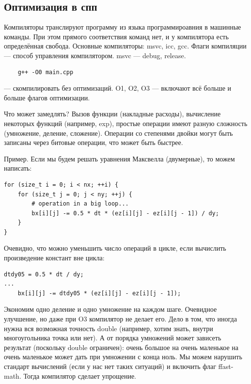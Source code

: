 \documentclass{book}
\begin{document}
\subsection{Оптимизация в спп}

Компиляторы транслируют программу из языка программироавния в машинные команды. При этом прямого
соответствия команд нет, и у компилятора есть определённая свобода. Основные компиляторы: msvc,
icc, gcc. Флаги компиляции --- способ управления компилятором. msvc --- debug, release.
\begin{verbatim}
    g++ -O0 main.cpp
\end{verbatim}
--- скомпилировать без оптимизаций. O1, O2, O3 --- включают всё больше и больше флагов оптимизации.

Что может замедлять? Вызов функции (накладные расходы), вычисление некоторых функций (например,
exp), простые операции имеют разную сложность (умножение, деление, сложение). Операции со степенями
двойки могут быть записаны через битовые операции, что может быть быстрее.

Пример. Если мы будем решать уравнения Максвелла (двумерные), то можем написать:
\begin{verbatim}
for (size_t i = 0; i < nx; ++i) {
    for (size_t j = 0; j < ny; ++j) {
        # operation in a big loop...
        bx[i][j] -= 0.5 * dt * (ez[i][j] - ez[i][j - 1]) / dy;
    }
}
\end{verbatim}
Очевидно, что можно уменьшить число операций в цикле, если вычислить произведение констант вне
цикла:
\begin{verbatim}
dtdy05 = 0.5 * dt / dy;
...
    bx[i][j] -= dtdy05 * (ez[i][j] - ez[i][j - 1]);
\end{verbatim}
Экономим одно деление и одно умножение на каждом шаге. Очевидное улучшение, но даже при O3
компилятор не делает его. Дело в том, что иногда нужна вся возможная точность double (например,
хотим знать, внутри многоугольника точка или нет). А от порядка умножений может зависеть результат
(поскольку double ограничен): очень большое на очень маленькое на очень маленькое может дать при
умножении с конца ноль. Мы можем нарушить стандарт вычислений (если у нас нет таких ситуаций) и
включить флаг ffast-math. Тогда компилятор сделает упрощение.
\end{document}
